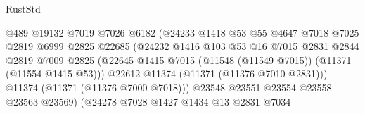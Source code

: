 \begin{lexlean}{RustStd}
\begin{coremodule}
                                          @489
                                          @19132
                                          @7019
                                          @7026
                                          @6182
                                          (@24233
                                            @1418
                                            @53
                                            @55
                                            @4647
                                            @7018
                                            @7025
                                            @2819
                                            @6999
                                            @2825
                                            @22685
                                            (@24232
                                              @1416
                                              @103
                                              @53
                                              @16
                                              @7015
                                              @2831
                                              @2844
                                              @2819
                                              @7009
                                              @2825
                                              (@22645
                                                @1415
                                                @7015
                                                (@11548 (@11549 @7015))
                                                (@11371 (@11554 @1415 @53)))
                                              @22612
                                              @11374
                                              (@11371 (@11376 @7010 @2831)))
                                            @11374
                                            (@11371 (@11376 @7000 @7018)))
                                          @23548
                                          @23551
                                          @23554
                                          @23558
                                          @23563
                                          @23569)
                                        (@24278
                                          @7028
                                          @1427
                                          @1434
                                          @13
                                          @2831
                                          @7034

\end{coremodule}
\end{lexlean}
